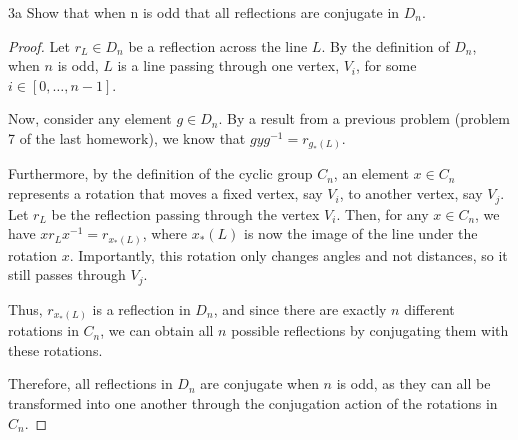 \documentclass{article}
\begin{document}
\begin{claim}{3a}
    Show that when n is odd that all reflections are conjugate in $D_n$. 
\end{claim}
\begin{proof}
    Let $r_L \in D_n$ be a reflection across the line $L$. By the definition of $D_n$, when $n$ is odd, $L$ is a line passing through one vertex, $V_i$, for some $i \in [0, \ldots, n-1]$.

    Now, consider any element $g \in D_n$. By a result from a previous problem (problem 7 of the last homework), we know that $gyg^{-1} = r_{g_*(L)}$.
    
    Furthermore, by the definition of the cyclic group $C_n$, an element $x \in C_n$ represents a rotation that moves a fixed vertex, say $V_i$, to another vertex, say $V_j$. Let $r_L$ be the reflection passing through the vertex $V_i$. Then, for any $x \in C_n$, we have $xr_Lx^{-1} = r_{x_*(L)}$, where $x_*(L)$ is now the image of the line under the rotation $x$. Importantly, this rotation only changes angles and not distances, so it still passes through $V_j$.
    
    Thus, $r_{x_*(L)}$ is a reflection in $D_n$, and since there are exactly $n$ different rotations in $C_n$, we can obtain all $n$ possible reflections by conjugating them with these rotations.
    
    Therefore, all reflections in $D_n$ are conjugate when $n$ is odd, as they can all be transformed into one another through the conjugation action of the rotations in $C_n$.
\end{proof}
\end{document}
